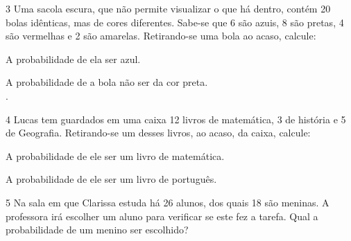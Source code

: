 
\num{3} Uma sacola escura, que não permite visualizar o que há dentro,
contém 20 bolas idênticas, mas de cores diferentes. Sabe-se que 6 são
azuis, 8 são pretas, 4 são vermelhas e 2 são amarelas. Retirando-se uma
bola ao acaso, calcule:

\begin{escolha}
\item
  A probabilidade de ela ser azul.\\

\item
  A probabilidade de a bola não ser da cor preta.\\
\hfill.
\end{escolha}


\num{4} Lucas tem guardados em uma caixa 12 livros de matemática, 3 de
história e 5 de Geografia. Retirando-se um desses livros, ao acaso, da
caixa, calcule:

\begin{escolha}
\item
  A probabilidade de ele ser um livro de matemática.\\

\item
  A probabilidade de ele ser um livro de português.\\
\end{escolha}

\num{5} Na sala em que Clarissa estuda há 26 alunos, dos quais 18 são
meninas. A professora irá escolher um aluno para verificar se este fez a
tarefa. Qual a probabilidade de um menino ser escolhido?

\begin{emptybox}
\vspace{1cm}
\end{emptybox}


